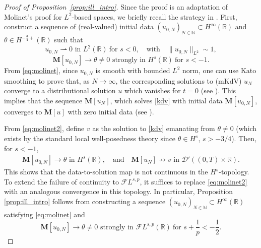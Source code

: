\documentclass[%
11pt,  reqno]{amsart}
\newcommand{\5}{\textup{V}}
\newcommand{\FL}{\mathcal{F} L}
\theoremstyle{remark}
\newcommand{\R}{\mathbb{R}}
\newcommand{\MMb}{\mathbf{M}}
\newcommand{\N}{\mathbb{N}}
\numberwithin{equation}{section}
\numberwithin{theorem}{section}
\begin{document}
\begin{proof}[Proof of Proposition~\ref{prop:ill_intro}]


Since the proof is an adaptation of Molinet's proof for $L^2$-based spaces, we briefly recall the strategy in \cite{Molinet_ill_line}. 
 First, construct a sequence of (real-valued) initial data $(u_{0,N})_{N\in\N}\subset H^\infty(\R)$ and $\theta\in H^{-\frac34+}(\R)$ such that
\begin{equation}\label{eq:molinet}
	u_{0,N}\rightharpoonup 0 \mbox{ in }L^2(\R)\ \text{for } s<0,\quad \text{with} 
    \quad \|u_{0,N}\|_{L^2}\sim 1,
\end{equation}
\begin{equation}\label{eq:molinet2}
 \MMb[u_{0,N}] \to \theta\neq 0  \mbox{ strongly in }H^{s}(\R)
 \ \text{for }
 s<-1.
\end{equation}
From \eqref{eq:molinet}, since $u_{0,N}$ is smooth with bounded $L^2$ norm, one can use Kato smoothing to prove that, as $N\to \infty$, the corresponding solutions to (mKdV) $u_N$ converge to a distributional solution $u$ which vanishes for $t=0$ (see \cite[Proposition 2.1]{Molinet_ill_line}). This implies that the sequence $\MMb[u_N]$, which solves \eqref{kdv} with initial data $\MMb[u_{0,N}]$, converges to $\MMb[u]$ with zero initial data (see \cite[Proposition 2.2]{Molinet_ill_line}). 

From \eqref{eq:molinet2}, define $v$ as the solution to \eqref{kdv} emanating from $\theta\neq 0$ (which exists by the standard local well-posedness theory since $\theta\in H^s$, $s>-3/4$). 
Then, for $s<-1$,
\begin{align}
\MMb[u_{0, N}] \to \theta \mbox{ in }H^s(\R), 
\quad
\text{and}
\quad
\MMb[u_N] \not\to v \mbox{ in  }\mathcal{D}'((0,T)\times \R).
\end{align}
This shows that the data-to-solution map is not continuous in the $H^s$-topology.
To extend the failure of continuity to $\FL^{s,p}$, it suffices to replace \eqref{eq:molinet2} with an analogous convergence in this topology.
In particular, Proposition \ref{prop:ill_intro} follows from constructing a sequence $(u_{0,N})_{N\in \N} \subset H^\infty(\R)$ satisfying \eqref{eq:molinet} and 
\begin{equation}\label{eq:molinet2_v2}
 \MMb[u_{0,N}] \to \theta\neq 0 \mbox{ strongly in }\mathcal{F}L^{s,p}(\R) \ \text{for } s+\frac1p<-\frac12.
\end{equation}





\end{proof}
\end{document}
